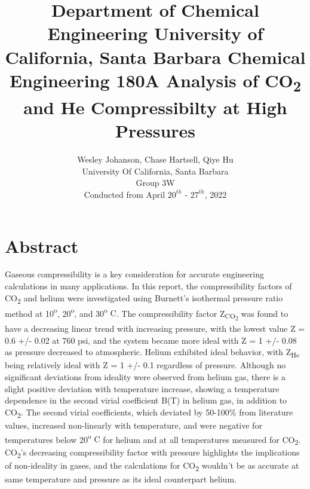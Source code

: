 \documentclass{article}
\title{Department of Chemical Engineering \linebreak
University of California, Santa Barbara \linebreak
\linebreak \linebreak \linebreak \linebreak
\linebreak \linebreak \linebreak
Chemical Engineering 180A \linebreak
Analysis of CO{{\textsubscript{2}}} and He Compressibilty at High Pressures \linebreak \linebreak \linebreak \linebreak
\linebreak \linebreak \linebreak \linebreak \linebreak \linebreak}
\author{Wesley Johanson, Chase Hartsell, Qiye Hu \\ 
        University Of California, Santa Barbara \\
        Group 3W\\
        Conducted from April $20^{th}$ - $27^{th}$, 2022
}
\begin{document}
 \maketitle \noindent 
\clearpage {} %

\section*{Abstract}

Gaseous compressibility is a key consideration for accurate engineering calculations in many applications. In this report, the compressibility factors of CO{\textsubscript{2}} and helium were investigated using Burnett's isothermal pressure ratio method at 10{\textsuperscript{o}}, 20{\textsuperscript{o}}, and 30{\textsuperscript{o} C}. The compressibility factor Z{{\textsubscript{CO{{\textsubscript{2}}}}}} was found to have a decreasing linear trend with increasing pressure, with the lowest value Z = 0.6 +/- 0.02 at 760 psi, and the system became more ideal with Z = 1 +/- 0.08 as pressure decreased to atmospheric. Helium exhibited ideal behavior, with Z{\textsubscript{He}} being relatively ideal with Z = 1 +/- 0.1 regardless of pressure. Although no significant deviations from ideality were observed from helium gas, there is a slight positive deviation with temperature increase, showing a temperature dependence in the second virial coefficient B(T) in helium gas, in addition to CO{\textsubscript{2}}. The second virial coefficients, which deviated by 50-100\% from literature values, increased non-linearly with temperature, and were negative for temperatures below 20{\textsuperscript{o} C} for helium and at all temperatures measured for CO{\textsubscript{2}}. CO{\textsubscript{2}}'s decreasing compressibility factor with pressure highlights the implications of non-ideality in gases, and the calculations for CO{\textsubscript{2}} wouldn't be as accurate at same temperature and pressure as its ideal counterpart helium. 

\end{document}
